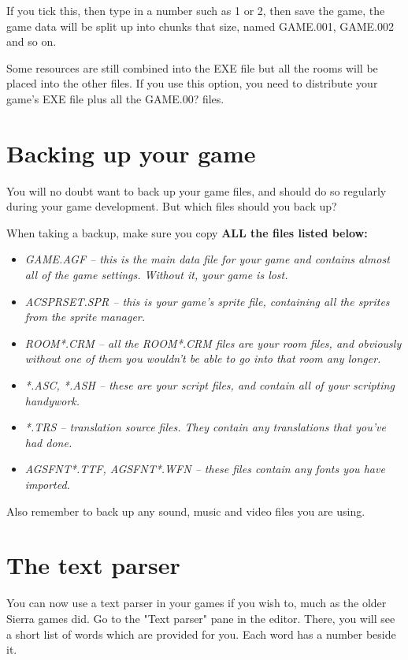 If you tick this, then type in a number such as 1 or 2, then save the game,
the game data will be split up into chunks that size, named GAME.001,
GAME.002 and so on.

Some resources are still combined into the EXE file but
all the rooms will be placed into the other files.
If you use this option, you need to distribute your game's EXE file plus
all the GAME.00? files.


\section{Backing up your game}%

You will no doubt want to back up your game files, and should do so regularly during
your game development. But which files should you back up?

When taking a backup, make sure you copy \bf{ALL} the files listed below:

\begin{itemize}
\item \it{GAME.AGF} -- this is the main data file for your game and contains almost
all of the game settings. Without it, your game is lost.
\item \it{ACSPRSET.SPR} -- this is your game's sprite file, containing all the sprites
from the sprite manager.
\item \it{ROOM*.CRM} -- all the ROOM*.CRM files are your room files, and obviously without
one of them you wouldn't be able to go into that room any longer.
\item \it{*.ASC, *.ASH} -- these are your script files, and contain all of your
scripting handywork.
\item \it{*.TRS} -- translation source files. They contain any translations that you've
had done.
\item \it{AGSFNT*.TTF, AGSFNT*.WFN} -- these files contain any fonts you have imported.
\end{itemize}

Also remember to back up any sound, music and video files you are using.

\section{The text parser}\label{TextParser}%

You can now use a text parser in your games if you wish to, much as the older
Sierra games did.  Go to the "Text parser" pane in the editor. There, you
will see a short list of words which are provided for you. Each word has a
number beside it.

